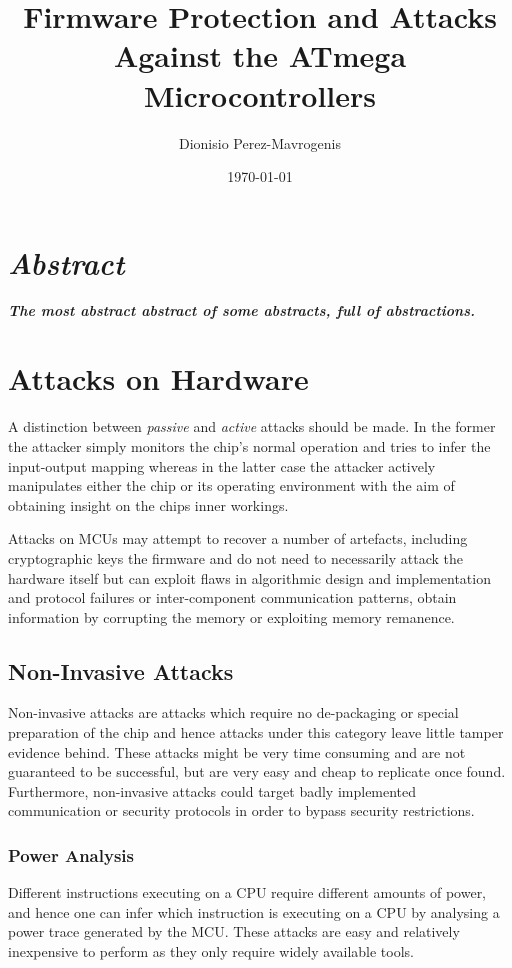 \documentclass[10pt,journal,compsoc]{IEEEtran}
\author{Dionisio Perez-Mavrogenis}
\title{Firmware Protection and Attacks Against the ATmega Microcontrollers}
\date{\today}
\begin{document}
	\maketitle
	
\section*{\emph{Abstract}}
	\textbf{\emph{The most abstract abstract of some abstracts, full of abstractions.}}
	




\section{Attacks on Hardware}
\label{sec:curr_attacks}
A distinction between \emph{passive} and \emph{active} attacks should be made. In the former the attacker simply monitors the chip's normal operation and tries to infer the input-output mapping whereas in the latter case the attacker actively manipulates either the chip or its operating environment with the aim of obtaining insight on the chips inner workings. 

Attacks on MCUs may attempt to recover a number of artefacts, including cryptographic keys the firmware and do not need to necessarily attack the hardware itself but can exploit flaws in algorithmic design and implementation and protocol failures or inter-component communication patterns\citep{anderson:cautionary_note}\citep{kocher:DPA}, obtain information by corrupting the memory or exploiting memory remanence\citep{sergei:thesis}\citep{gutman:memory_remanence}.

	\subsection{Non-Invasive Attacks}
	Non-invasive attacks are attacks which require no de-packaging or special preparation of the chip and hence attacks under this category leave little tamper evidence behind. These attacks might be very time consuming and are not guaranteed to be successful, but are very easy and cheap to replicate once found. Furthermore, non-invasive attacks could target badly implemented communication or security protocols in order to bypass security restrictions.
	
	\subsubsection{Power Analysis}
	\label{subsubsec:power_analysis}
	Different instructions executing on a CPU require different amounts of power, and hence one can infer which instruction is executing on a CPU by analysing a power trace generated by the MCU. These attacks are easy and relatively inexpensive to perform as they only require widely available tools.
	
\end{document}

